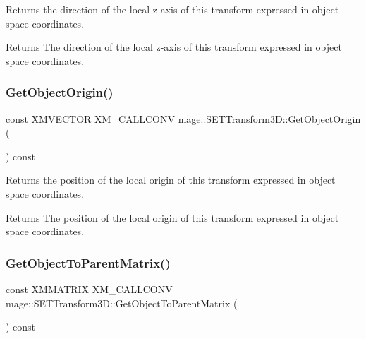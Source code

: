 Returns the direction of the local z-\/axis of this transform expressed in object space coordinates.

\begin{DoxyReturn}{Returns}
The direction of the local z-\/axis of this transform expressed in object space coordinates. 
\end{DoxyReturn}
\mbox{\label{classmage_1_1_s_e_t_transform3_d_a5ece58ae7ebd189139cac5888283341b}} 
\subsubsection{\texorpdfstring{Get\+Object\+Origin()}{GetObjectOrigin()}}
{\footnotesize\ttfamily const X\+M\+V\+E\+C\+T\+OR X\+M\+\_\+\+C\+A\+L\+L\+C\+O\+NV mage\+::\+S\+E\+T\+Transform3\+D\+::\+Get\+Object\+Origin (\begin{DoxyParamCaption}{ }\end{DoxyParamCaption}) const\hspace{0.3cm}{\ttfamily [noexcept]}}

Returns the position of the local origin of this transform expressed in object space coordinates.

\begin{DoxyReturn}{Returns}
The position of the local origin of this transform expressed in object space coordinates. 
\end{DoxyReturn}
\mbox{\label{classmage_1_1_s_e_t_transform3_d_a23a0d9a7ce94351117484683588cb2b6}} 
\subsubsection{\texorpdfstring{Get\+Object\+To\+Parent\+Matrix()}{GetObjectToParentMatrix()}}
{\footnotesize\ttfamily const X\+M\+M\+A\+T\+R\+IX X\+M\+\_\+\+C\+A\+L\+L\+C\+O\+NV mage\+::\+S\+E\+T\+Transform3\+D\+::\+Get\+Object\+To\+Parent\+Matrix (\begin{DoxyParamCaption}{ }\end{DoxyParamCaption}) const\hspace{0.3cm}{\ttfamily [noexcept]}}

